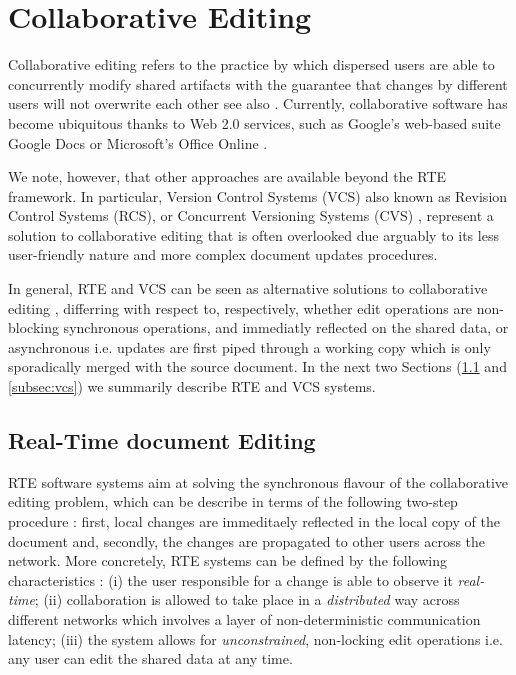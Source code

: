 \documentclass{sig-alternate}
\begin{document}
\section{Collaborative Editing}\label{sec:cde}
Collaborative editing refers to the practice by which dispersed
users are able to concurrently modify shared artifacts with the guarantee that changes
by different users will not overwrite each other \textemdash see also \cite{Altmanninger2009}.
Currently, collaborative software has become ubiquitous thanks to Web 2.0 services, such as
Google's web-based suite Google Docs \cite{Googlea} or
Microsoft's Office Online \cite{Microsoft}.

We note, however, that other approaches are available beyond the RTE framework. In
particular, Version Control Systems (VCS) \textemdash also known as Revision Control
Systems (RCS), or Concurrent Versioning Systems (CVS) \textemdash, represent a solution
to collaborative editing that is often overlooked due arguably to its less user-friendly
nature and more complex document updates procedures.

In general, RTE and VCS can be seen as alternative solutions to collaborative
editing \cite{Altmanninger2009}, differring with respect to, respectively, whether edit
operations are non-blocking synchronous operations, and immediatly reflected on the shared
data, or asynchronous \textemdash i.e. updates are first piped
through a working copy which is only sporadically merged with the source document.
In the next two Sections (\ref{subsec:rte} and \ref{subsec:vcs}) we summarily describe RTE
and VCS systems.

\subsection{Real-Time document Editing}\label{subsec:rte}
RTE software systems aim at solving the synchronous flavour of the collaborative editing
problem, which can be describe in terms of the following two-step procedure \cite{Imine2009}:
first, local changes are immeditaely reflected in the local copy of the document and, secondly,
the changes are propagated to other users across the network.
More concretely, RTE systems can be defined by the following characteristics \cite{Sun1998}:
(i) the user responsible for a change is able to observe it \textit{real-time};
(ii) collaboration is allowed to take place in a \textit{distributed} way across
different networks \textemdash which involves a layer of non-deterministic communication
latency; (iii) the system allows for \textit{unconstrained}, non-locking edit operations
\textemdash i.e. any user can edit the shared data at any time.
\end{document}
